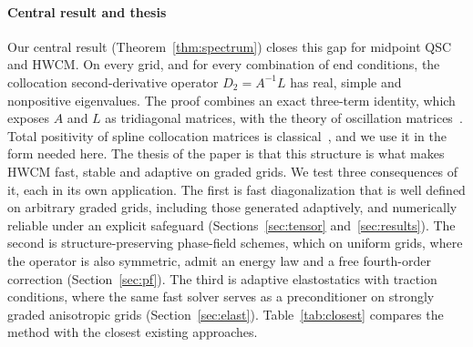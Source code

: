 \documentclass[preprint,12pt]{elsarticle}
\theoremstyle{remark}
\begin{document}
\paragraph{Central result and thesis}
Our central result (Theorem~\ref{thm:spectrum}) closes this gap for midpoint QSC and HWCM. On every grid, and for every
combination of end conditions, the collocation second-derivative operator $D_2=A^{-1}L$ has real,
simple and nonpositive eigenvalues. The proof combines an exact three-term identity, which exposes
$A$ and $L$ as tridiagonal matrices, with the theory of oscillation
matrices~\cite{gantmacher2002oscillation,fallat2011totally}. Total positivity of spline collocation
matrices is classical~\cite{karlin1968total,deboor2001practical}, and we use it in the form needed here.
The thesis of the paper is that this structure is what makes HWCM fast, stable and adaptive on graded
grids. We test three consequences of it, each in its own application. The first is fast diagonalization that is well defined on arbitrary graded grids, including those generated adaptively, and numerically reliable under an explicit safeguard (Sections~\ref{sec:tensor}
and~\ref{sec:results}). The second is structure-preserving phase-field schemes, which on uniform grids,
where the operator is also symmetric, admit an energy law and a free fourth-order correction
(Section~\ref{sec:pf}). The third is adaptive elastostatics with traction conditions, where the same
fast solver serves as a preconditioner on strongly graded anisotropic grids (Section~\ref{sec:elast}).
Table~\ref{tab:closest} compares the method with the closest existing approaches.
\end{document}
